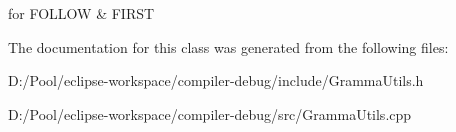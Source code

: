for F\+O\+L\+L\+OW \& F\+I\+R\+ST 

The documentation for this class was generated from the following files\+:\begin{DoxyCompactItemize}
\item 
D\+:/\+Pool/eclipse-\/workspace/compiler-\/debug/include/Gramma\+Utils.\+h\item 
D\+:/\+Pool/eclipse-\/workspace/compiler-\/debug/src/Gramma\+Utils.\+cpp\end{DoxyCompactItemize}
